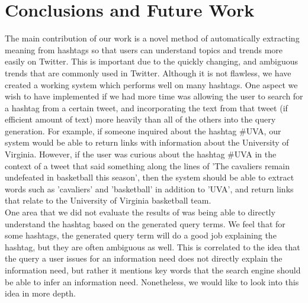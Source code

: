 \documentclass{sig-alternate}
\begin{document}
\section{Conclusions and Future Work}
\label{sec:conclusions}
The main contribution of our work is a novel method of automatically extracting meaning from hashtags so that users can understand topics and trends more easily on Twitter. This is important due to the quickly changing, and ambiguous trends that are commonly used in Twitter. Although it is not flawless, we have created a working system which performs well on many hashtags.
One aspect we wish to have implemented if we had more time was allowing the user to search for a hashtag from a certain tweet, and incorporating the text from that tweet (if efficient amount of text) more heavily than all of the others into the query generation. For example, if someone inquired about the hashtag \#UVA, our system would be able to return links with information about the University of Virginia. However, if the user was curious about the hashtag \#UVA in the context of a tweet that said something along the lines of 'The cavaliers remain undefeated in basketball this season', then the system should be able to extract words such as 'cavaliers' and 'basketball' in addition to 'UVA', and return links that relate to the University of Virginia basketball team.\\ 
One area that we did not evaluate the results of was being able to directly understand the hashtag based on the generated query terms. We feel that for some hashtags, the generated query term will do a good job explaining the hashtag, but they are often ambiguous as well. This is correlated to the idea that the query a user issues for an information need does not directly explain the information need, but rather it mentions key words that the search engine should be able to infer an information need. Nonetheless, we would like to look into this idea in more depth. 




\end{document}
